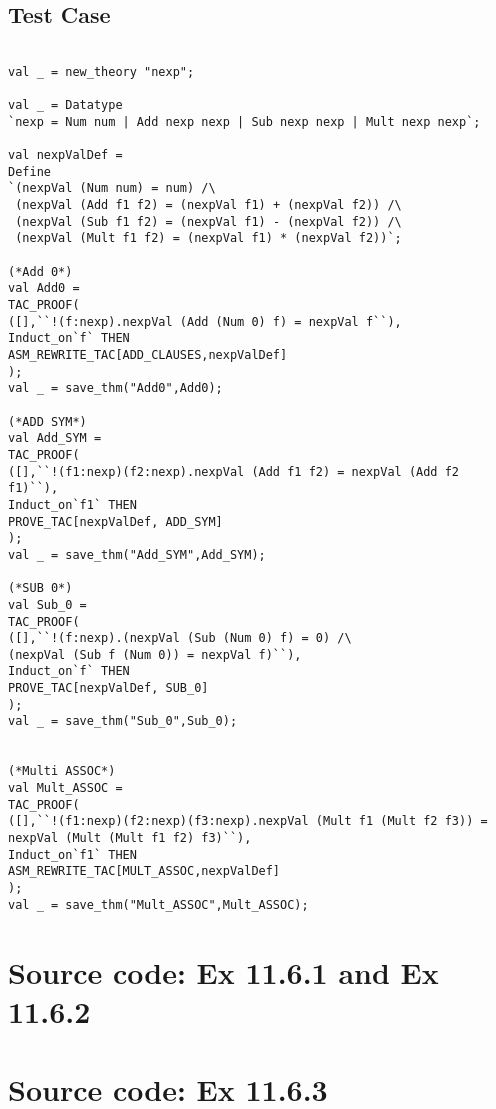 \documentclass{report}
\begin{document}
\section{Test Case}
\label{trans-11-6-3}
\begin{session}
  \begin{scriptsize}
\begin{verbatim}

val _ = new_theory "nexp";

val _ = Datatype
`nexp = Num num | Add nexp nexp | Sub nexp nexp | Mult nexp nexp`;

val nexpValDef =
Define
`(nexpVal (Num num) = num) /\
 (nexpVal (Add f1 f2) = (nexpVal f1) + (nexpVal f2)) /\
 (nexpVal (Sub f1 f2) = (nexpVal f1) - (nexpVal f2)) /\
 (nexpVal (Mult f1 f2) = (nexpVal f1) * (nexpVal f2))`;

(*Add 0*)
val Add0 = 
TAC_PROOF(
([],``!(f:nexp).nexpVal (Add (Num 0) f) = nexpVal f``),
Induct_on`f` THEN
ASM_REWRITE_TAC[ADD_CLAUSES,nexpValDef]
);
val _ = save_thm("Add0",Add0);

(*ADD SYM*)
val Add_SYM = 
TAC_PROOF(
([],``!(f1:nexp)(f2:nexp).nexpVal (Add f1 f2) = nexpVal (Add f2 f1)``),
Induct_on`f1` THEN
PROVE_TAC[nexpValDef, ADD_SYM]
);
val _ = save_thm("Add_SYM",Add_SYM);

(*SUB 0*)
val Sub_0 =
TAC_PROOF(
([],``!(f:nexp).(nexpVal (Sub (Num 0) f) = 0) /\
(nexpVal (Sub f (Num 0)) = nexpVal f)``),
Induct_on`f` THEN
PROVE_TAC[nexpValDef, SUB_0]
);
val _ = save_thm("Sub_0",Sub_0);


(*Multi ASSOC*)
val Mult_ASSOC = 
TAC_PROOF(
([],``!(f1:nexp)(f2:nexp)(f3:nexp).nexpVal (Mult f1 (Mult f2 f3)) =
nexpVal (Mult (Mult f1 f2) f3)``),
Induct_on`f1` THEN
ASM_REWRITE_TAC[MULT_ASSOC,nexpValDef]
);
val _ = save_thm("Mult_ASSOC",Mult_ASSOC);
\end{verbatim}
  \end{scriptsize}
\end{session}

\appendix{}

\chapter{Source code: Ex 11.6.1 and Ex 11.6.2}
\label{cha:source-code-ex11-1}



\chapter{Source code: Ex 11.6.3}
\label{cha:source-code-ex11-3}

\end{document}
